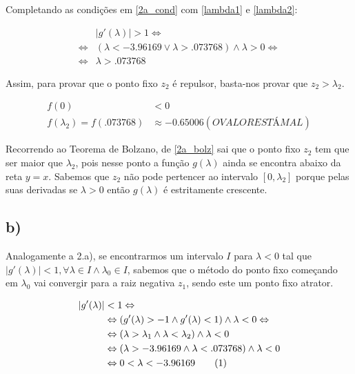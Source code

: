 \documentclass[a4paper, 18pt]{article}
\begin{document}
	\par
	Completando as condições em \eqref{2a_cond} com \eqref{lambda1} e \eqref{lambda2}:

	\begin{align*}
		&|g'(\lambda)| > 1 \Leftrightarrow \\ \Leftrightarrow
		&(\lambda < -3.96169 \vee \lambda > .073768) \wedge \lambda > 0 \Leftrightarrow \\ \Leftrightarrow
		&\lambda > .073768
	\end{align*}

	\par
	Assim, para provar que o ponto fixo $z_2$ é repulsor, basta-nos provar que $z_2 > \lambda_2$.

	\begin{equation} \label{2a_bolz}
	\begin{split}
		f(0) &< 0 \\
		f(\lambda_2) = f(.073768) &\approx -0.65006 (O VALOR ESTÁ MAL)
	\end{split}
	\end{equation}

	\par
	Recorrendo ao Teorema de Bolzano, de \eqref{2a_bolz} sai que o ponto fixo $z_2$ tem que ser maior que $\lambda_2$, pois nesse ponto a função $g(\lambda)$ ainda se encontra abaixo da reta $y = x$. Sabemos que $z_2$ não pode pertencer ao intervalo $[0, \lambda_2]$ porque pelas suas derivadas se $\lambda > 0$ então $g(\lambda)$ é estritamente crescente.

\subsection*{b)}
	\par
	Analogamente a 2.a), se encontrarmos um intervalo $I$ para $\lambda < 0$ tal que $|g'(\lambda)| < 1, \forall \lambda \in I \wedge \lambda_0 \in I$, sabemos que o método do ponto fixo começando em $\lambda_0$ vai convergir para a raiz negativa $z_1$, sendo este um ponto fixo atrator.

	\par
	
	\begin{align*}
		|g'(\lambda)| &< 1 \Leftrightarrow \\ &\Leftrightarrow
		(g'(\lambda) > -1 \wedge g'(\lambda) < 1) \wedge \lambda < 0 \Leftrightarrow \\ &\Leftrightarrow
		(\lambda > \lambda_1 \wedge \lambda < \lambda_2) \wedge \lambda < 0 \\ &\Leftrightarrow
		(\lambda > -3.96169 \wedge \lambda < .073768) \wedge \lambda < 0  \stepcounter{equation} \\ &\Leftrightarrow 
		0 < \lambda < -3.96169 \tag{\theequation}\label{2a_cond}
	\end{align*}
	
\end{document}
